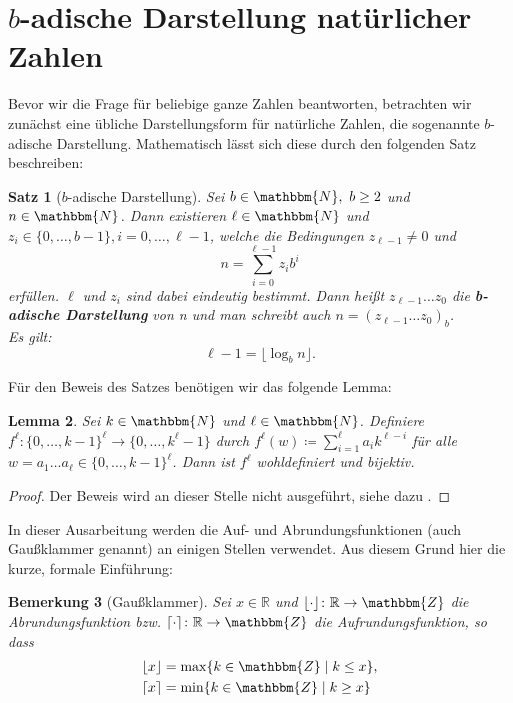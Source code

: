 \documentclass{article}
\newcommand{\N}{\mathbbm{N}} %
\newcommand{\Z}{\mathbbm{Z}} %
\newcommand{\R}{\mathbb{R}} %
\newcommand{\nbdash}{\mbox{-}} %
\newtheorem{satz}{Satz}
\newtheorem{lemma}[satz]{Lemma}
\newtheorem{bemerkung}[satz]{Bemerkung}
\begin{document}
\newpage

\section{$b$-adische Darstellung natürlicher Zahlen}
  Bevor wir die Frage für beliebige ganze Zahlen beantworten, betrachten wir zunächst eine übliche Darstellungsform für natürliche Zahlen, die sogenannte $b$-adische Darstellung.
  Mathematisch lässt sich diese durch den folgenden Satz beschreiben: 

  \begin{satz}[$b$-adische Darstellung] \label{satz:b-adische_Darstellung}
    Sei $b\in \N,~ b \geq 2$ und $n \in \N$. 
    Dann existieren $\ell \in \N$ und $z_i \in \{0, \dots, b-1\}, {i = 0, \dots, \ell-1}$, welche die Bedingungen $z_{\ell-1} \neq 0$ und 
    \begin{equation}
      n = \sum_{i=0}^{\ell-1}z_ib^i \label{eq:b-adische_Darstellung_n}
    \end{equation}
    erfüllen.
    $\ell$ und $z_i$ sind dabei eindeutig bestimmt. Dann heißt $z_{\ell-1}\dots z_0$ die \textbf{b\nbdash adische Darstellung} von n und man schreibt auch $n={(z_{\ell-1} \dots z_0)}_b$. \\
    Es gilt: 
    \begin{equation}
      \ell-1 = \lfloor \log_b n \rfloor. \label{eq:b-adische_Darstellung_log}
    \end{equation}
  \end{satz}

  Für den Beweis des Satzes benötigen wir das folgende Lemma:

    \begin{lemma} \label{lemma:Eindeutigkeit_b-adische_Darstellung}
      Sei $k \in \N$ und $\ell \in \N$. 
      Definiere $f^\ell \colon \{0, \dots, k-1\}^\ell \to \{0, \dots, k^\ell-1\}$ durch $f^\ell(w) \coloneq \sum_{i=1}^\ell a_i k^{\ell-i}$ für alle $w=a_1 \dots a_\ell \in \{0, \dots, k-1\}^\ell$.
      Dann ist $f^\ell$ wohldefiniert und bijektiv.
    \end{lemma}
      \begin{proof}
        Der Beweis wird an dieser Stelle nicht ausgeführt, siehe dazu \cite[S.~17f,~Lemma~1.19]{hougardy2018}.
      \end{proof}

    In dieser Ausarbeitung werden die Auf- und Abrundungsfunktionen (auch Gaußklammer genannt) an einigen Stellen verwendet.
    Aus diesem Grund hier die kurze, formale Einführung:
    \begin{bemerkung}[Gaußklammer]\label{bem:Gaussklammer}
      Sei $x \in \R$ und $\lfloor \cdot \rfloor \colon \R \to \Z$ die Abrundungsfunktion bzw. $\lceil \cdot \rceil \colon \R \to \Z$ die Aufrundungsfunktion, so dass
      \begin{align*}
        \lfloor x \rfloor &= \max\{k \in \Z \mid k \leq x\}, \\
        \lceil x \rceil &= \min\{k \in \Z \mid k \geq x\}
      \end{align*}
    \end{bemerkung}
    
\end{document}
